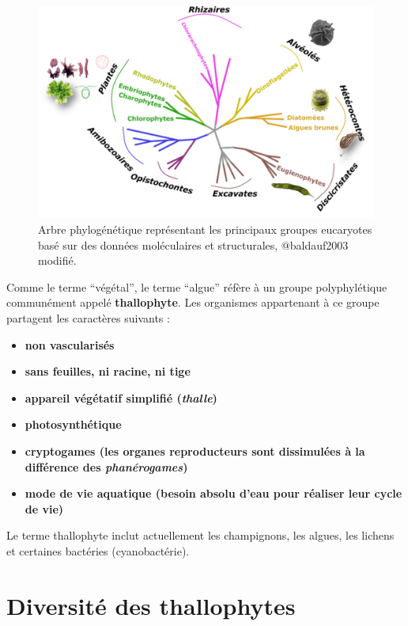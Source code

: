 \documentclass[
]{book}
\providecommand{\tightlist}{%
  \setlength{\itemsep}{0pt}\setlength{\parskip}{0pt}}
\begin{document}
\begin{figure}

{\centering \includegraphics[width=21.12in]{images/arbre_phylogenetique} 

}

\caption{Arbre phylogénétique représentant les principaux groupes eucaryotes basé sur des données moléculaires et structurales, @baldauf2003 modifié.}\label{fig:arbre-phylo}
\end{figure}

Comme le terme ``végétal'', le terme ``algue'' réfère à un groupe polyphylétique communément appelé \textbf{thallophyte}. Les organismes appartenant à ce groupe partagent les caractères suivants :

\begin{itemize}
\tightlist
\item
  \textbf{non vascularisés}
\item
  \textbf{sans feuilles, ni racine, ni tige}
\item
  \textbf{appareil végétatif simplifié (\emph{thalle})}
\item
  \textbf{photosynthétique}
\item
  \textbf{cryptogames (les organes reproducteurs sont dissimulées à la différence des \emph{phanérogames})}
\item
  \textbf{mode de vie aquatique (besoin absolu d'eau pour réaliser leur cycle de vie)}
\end{itemize}

Le terme thallophyte inclut actuellement les champignons, les algues, les lichens et certaines bactéries (cyanobactérie).

\hypertarget{diversituxe9-des-thallophytes}{%
\section{Diversité des thallophytes}\label{diversituxe9-des-thallophytes}}
\end{document}
